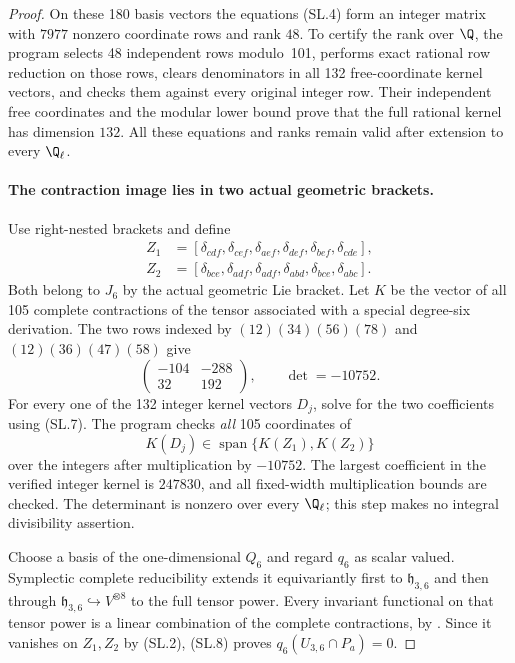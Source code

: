 \begin{proof}
On these 180 basis vectors the equations (SL.4) form an integer
matrix with $7977$ nonzero coordinate rows and rank $48$.
To certify the rank over $\Q$, the program selects 48 independent
rows modulo~101, performs exact rational row reduction on those
rows, clears denominators in all 132 free-coordinate kernel
vectors, and checks them against every original integer row.
Their independent free coordinates and the modular lower bound
prove that the full rational kernel has dimension $132$.
All these equations and ranks remain valid after extension to
every $\Q_\ell$.

\paragraph{The contraction image lies in two actual geometric brackets.}
Use right-nested brackets and define
\[
\begin{split}
 Z_1&=[\delta_{cdf},\delta_{cef},\delta_{aef},
                  \delta_{def},\delta_{bef},\delta_{cde}],\\
 Z_2&=[\delta_{bce},\delta_{adf},\delta_{adf},
                  \delta_{abd},\delta_{bce},\delta_{abc}].
\end{split}                                                   \tag{SL.6}
\]
Both belong to $J_6$ by the actual geometric Lie bracket.
Let $K$ be the vector of all 105 complete contractions of
the tensor associated with a special degree-six derivation.
The two rows indexed by
$(12)(34)(56)(78)$ and $(12)(36)(47)(58)$ give
\[
 \begin{pmatrix}-104&-288\\32&192\end{pmatrix},
             \qquad\det=-10752.                           \tag{SL.7}
\]
For every one of the 132 integer kernel vectors $D_j$, solve
for the two coefficients using (SL.7). The program checks
\emph{all} 105 coordinates of
\[
                 K(D_j)\in\operatorname{span}\{K(Z_1),K(Z_2)\}
                                                               \tag{SL.8}
\]
over the integers after multiplication by $-10752$.
The largest coefficient in the verified integer kernel is
$247830$, and all fixed-width multiplication bounds are checked.
The determinant is nonzero over every $\Q_\ell$; this step
makes no integral divisibility assertion.

Choose a basis of the one-dimensional $Q_6$ and regard $q_6$
as scalar valued. Symplectic complete reducibility extends it
equivariantly first to $\mathfrak h_{3,6}$ and then through
$\mathfrak h_{3,6}\hookrightarrow V^{\otimes8}$ to the full
tensor power. Every invariant functional on that tensor power
is a linear combination of the complete contractions, by
\cite[Proposition~2.1, p.~8]{AuditMoritaSakasaiSuzuki2015v2}.
Since it vanishes on $Z_1,Z_2$ by (SL.2), (SL.8) proves
$q_6(U_{3,6}\cap P_a)=0$.


\end{proof}
